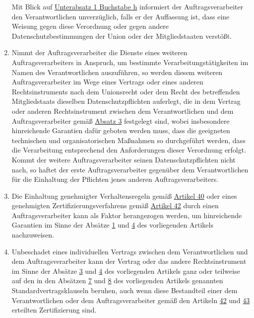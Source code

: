 \begin{enumerate}
  Mit Blick auf \hyperref[itm:28-3-1h]{Unterabsatz 1 Buchstabe h} informiert der Auftragsverarbeiter den
  Verantwortlichen
  unverzüglich, falls er der Auffassung ist, dass eine Weisung gegen diese Verordnung oder gegen andere
  Datenschutzbestimmungen der Union oder der Mitgliedstaaten verstößt.
  \label{itm:28-3-2}

  \item Nimmt der Auftragsverarbeiter die Dienste eines weiteren Auftragsverarbeiters in Anspruch, um bestimmte
   Verarbeitungstätigkeiten im Namen des Verantwortlichen auszuführen, so werden diesem weiteren Auftragsverarbeiter im
   Wege eines Vertrags oder eines anderen Rechtsinstruments nach dem Unionsrecht oder dem Recht des betreffenden
   Mitgliedstaats dieselben Datenschutzpflichten auferlegt, die in dem Vertrag oder anderen Rechtsinstrument zwischen
   dem Verantwortlichen und dem Auftragsverarbeiter gemäß \hyperref[itm:28-3-1]{Absatz 3} festgelegt sind, wobei
   insbesondere hinreichende Garantien dafür geboten werden muss, dass die geeigneten technischen und organisatorischen
   Maßnahmen so durchgeführt werden, dass die Verarbeitung entsprechend den Anforderungen dieser Verordnung erfolgt.
   Kommt der weitere Auftragsverarbeiter seinen Datenschutzpflichten nicht nach, so haftet der erste
   Auftragsverarbeiter gegenüber dem Verantwortlichen für die Einhaltung der Pflichten jenes anderen
   Auftragsverarbeiters.
  \label{itm:28-4}

  \item Die Einhaltung genehmigter Verhaltensregeln gemäß \hyperref[ch:40]{Artikel 40} oder eines genehmigten
   Zertifizierungsverfahrens gemäß \hyperref[ch:42]{Artikel 42} durch einen Auftragsverarbeiter kann als Faktor
   herangezogen werden, um hinreichende Garantien im Sinne der Absätze \hyperref[itm:28-1]{1} und \hyperref[itm:28-4]
   {4} des vorliegenden Artikels nachzuweisen.
  \label{itm:28-5}

  \item Unbeschadet eines individuellen Vertrags zwischen dem Verantwortlichen und dem Auftragsverarbeiter kann der
   Vertrag oder das andere Rechtsinstrument im Sinne der Absätze \hyperref[itm:28-3-1]{3} und \hyperref[itm:28-4]{4} des
   vorliegenden Artikels ganz oder teilweise auf den in den Absätzen \hyperref[itm:28-7]{7} und \hyperref[itm:28-8]
   {8} des vorliegenden Artikels genannten Standardvertragsklauseln beruhen, auch wenn diese Bestandteil einer dem
   Verantwortlichen oder dem Auftragsverarbeiter gemäß den Artikeln \hyperref[ch:42]{42} und \hyperref[ch:43]{43}
   erteilten Zertifizierung sind.
  \label{itm:28-6}


\end{enumerate}
